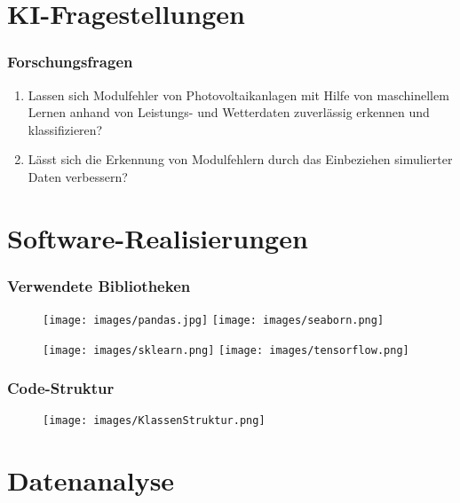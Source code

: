\documentclass[utf8x, xcolor=dvipsnames]{beamer}
\begin{document}
\section[Fragestellungen]{KI-Fragestellungen}

\begin{frame}
\frametitle{Forschungsfragen}
\begin{enumerate}
	\item Lassen sich Modulfehler von Photovoltaikanlagen mit Hilfe von maschinellem Lernen anhand von Leistungs- und Wetterdaten zuverlässig erkennen und klassifizieren?\newline
	\item Lässt sich die Erkennung von Modulfehlern durch das Einbeziehen simulierter Daten verbessern?
\end{enumerate}
\end{frame}

\section[Realisierungen]{Software-Realisierungen}

\begin{frame}
\frametitle{Verwendete Bibliotheken}
\begin{figure}
	\texttt{[image: images/pandas.jpg]}
	\texttt{[image: images/seaborn.png]}
\end{figure}
\begin{figure}
	\texttt{[image: images/sklearn.png]}
	\texttt{[image: images/tensorflow.png]}
\end{figure}
\end{frame}


\begin{frame}
\frametitle{Code-Struktur}
\begin{figure}
	\texttt{[image: images/KlassenStruktur.png]}
\end{figure}
\end{frame}

\section{Datenanalyse}
\end{document}
